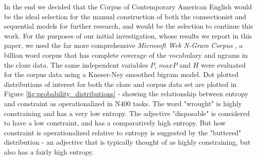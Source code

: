 \documentclass{article}
\begin{document}
In the end we decided that the Corpus of Contemporary American English \cite{davies2008} would be the ideal selection for the manual construction of both the connectionist and sequential models for further research, and would be the selection to continue this work. For the purposes of our initial investigation, whose results we report in this paper, we used the far more comprehensive \textit{Microsoft Web N-Gram Corpus} \cite{wang2010overview}, a billion word corpus that has complete coverage of the vocabulary and ngrams in the cloze data. The same independent variables $P$, $maxP$ and $H$ were evaluated for the corpus data using a Kneser-Ney smoothed bigram model. Dot plotted distributions of interest for both the cloze and corpus data set are plotted in Figure \ref{fig:probability_distributions} - showing the relationship between entropy and constraint as operationalized in N400 tasks. The word "wrought" is highly constraining and has a very low entropy. The adjective "disposable" is considered to have a low constraint, and has a comparatively high entropy. But how constraint is operationalized relative to entropy is suggested by the "buttered" distribution - an adjective that is typically thought of as highly constraining, but also has a fairly high entropy.
\end{document}
